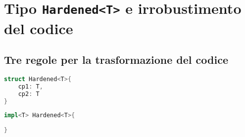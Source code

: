 \section{Tipo \texttt{Hardened<T>} e irrobustimento del codice} \label{sec:hardened}

\subsection{Tre regole per la trasformazione del codice}

\begin{lstlisting}[language=Rust, style=boxed]
struct Hardened<T>{
    cp1: T, 
    cp2: T
}
\end{lstlisting}


\begin{lstlisting}[language=Rust, style=boxed]
impl<T> Hardened<T>{
    
}
\end{lstlisting}
